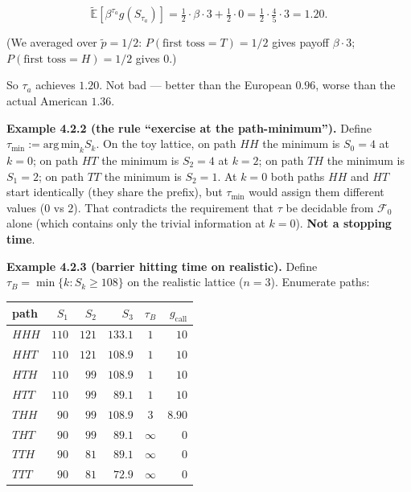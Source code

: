 \documentclass[
  10pt,
  twoside]{book}
\newcounter{none} %
\begin{document}
\[\tilde{\mathbb{E}}[\beta^{\tau_a} g(S_{\tau_a})] = \tfrac{1}{2}\!\cdot\!\beta\!\cdot\!3 + \tfrac{1}{2}\!\cdot\!0 = \tfrac{1}{2}\!\cdot\!\tfrac{4}{5}\!\cdot\!3 = 1.20.\]

(We averaged over \(\tilde p = 1/2\): \(P(\text{first toss} = T) = 1/2\)
gives payoff \(\beta \cdot 3\); \(P(\text{first toss} = H) = 1/2\) gives
\(0\).)

So \(\tau_a\) achieves \(1.20\). Not bad --- better than the European
\(0.96\), worse than the actual American \(1.36\).

\textbf{Example 4.2.2 (the rule ``exercise at the path-minimum'').}
Define \(\tau_{\min} := \mathrm{arg\,min}_k S_k\). On the toy lattice,
on path \(HH\) the minimum is \(S_0 = 4\) at \(k = 0\); on path \(HT\)
the minimum is \(S_2 = 4\) at \(k = 2\); on path \(TH\) the minimum is
\(S_1 = 2\); on path \(TT\) the minimum is \(S_2 = 1\). At \(k = 0\)
both paths \(HH\) and \(HT\) start identically (they share the prefix),
but \(\tau_{\min}\) would assign them different values (\(0\) vs \(2\)).
That contradicts the requirement that \(\tau\) be decidable from
\(\mathcal F_0\) alone (which contains only the trivial information at
\(k = 0\)). \textbf{Not a stopping time}.

\textbf{Example 4.2.3 (barrier hitting time on realistic).} Define
\(\tau_B = \min\{k : S_k \ge 108\}\) on the realistic lattice
(\(n = 3\)). Enumerate paths:

{\def\LTcaptype{none} %
\begin{table}[H]
\centering
\begin{tabular}{|l|r|r|r|c|r|}
\toprule
path & \(S_1\) & \(S_2\) & \(S_3\) & \(\tau_B\) & \(g_{\text{call}}\) \\
\midrule



\(HHH\) & \(110\) & \(121\) & \(133.1\) & \(1\) & \(10\) \\
\(HHT\) & \(110\) & \(121\) & \(108.9\) & \(1\) & \(10\) \\
\(HTH\) & \(110\) & \(99\) & \(108.9\) & \(1\) & \(10\) \\
\(HTT\) & \(110\) & \(99\) & \(89.1\) & \(1\) & \(10\) \\
\(THH\) & \(90\) & \(99\) & \(108.9\) & \(3\) & \(8.90\) \\
\(THT\) & \(90\) & \(99\) & \(89.1\) & \(\infty\) & \(0\) \\
\(TTH\) & \(90\) & \(81\) & \(89.1\) & \(\infty\) & \(0\) \\
\(TTT\) & \(90\) & \(81\) & \(72.9\) & \(\infty\) & \(0\) \\
\bottomrule
\end{tabular}
\end{table}
}
\end{document}
